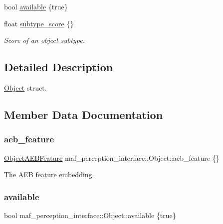 \begin{DoxyCompactItemize}
bool \hyperlink{structmaf__perception__interface_1_1Object_ab9fff48b838ba6c8ced1001aeb6985d9}{available} \{true\}
\item 
float \hyperlink{structmaf__perception__interface_1_1Object_a061b06ea6f694f218e51e8c3d84d91a5}{subtype\+\_\+score} \{\}
\begin{DoxyCompactList}\small\item\em Score of an object subtype. \end{DoxyCompactList}\end{DoxyCompactItemize}


\subsection{Detailed Description}
\hyperlink{structmaf__perception__interface_1_1Object}{Object} struct. 

\subsection{Member Data Documentation}
\mbox{\label{structmaf__perception__interface_1_1Object_a1358bb68ae9ab88dabfc67a8576d7182}} 
\subsubsection{\texorpdfstring{aeb\+\_\+feature}{aeb\_feature}}
{\footnotesize\ttfamily \hyperlink{structmaf__perception__interface_1_1ObjectAEBFeature}{Object\+A\+E\+B\+Feature} maf\+\_\+perception\+\_\+interface\+::\+Object\+::aeb\+\_\+feature \{\}}



The A\+EB feature embedding. 

\mbox{\label{structmaf__perception__interface_1_1Object_ab9fff48b838ba6c8ced1001aeb6985d9}} 
\subsubsection{\texorpdfstring{available}{available}}
{\footnotesize\ttfamily bool maf\+\_\+perception\+\_\+interface\+::\+Object\+::available \{true\}}

